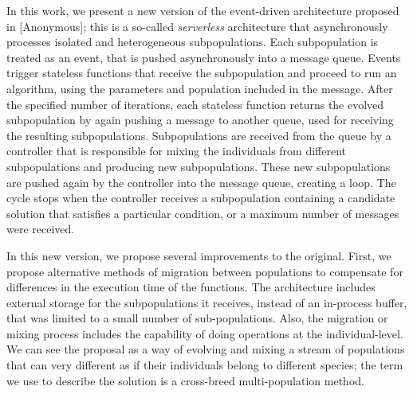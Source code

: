 \documentclass[runningheads]{llncs}
\begin{document}
In this work, we present a new version of the event-driven architecture proposed
in [Anonymous]; this is a so-called {\em serverless} architecture that
asynchronously processes isolated and heterogeneous subpopulations. Each
subpopulation is treated as an event, that is pushed asynchronously into a
message queue. Events trigger stateless functions that receive the subpopulation
and proceed to run an algorithm, using the parameters and population included in
the message. After the specified number of iterations, each stateless function
returns the evolved subpopulation by again pushing a message to another queue,
used for receiving the resulting subpopulations. Subpopulations are received
from the queue by a controller that is responsible for mixing the individuals
from different subpopulations and producing new subpopulations. These new
subpopulations are pushed again by the controller into the message queue,
creating a loop. The cycle stops when the controller receives a subpopulation
containing a candidate solution that satisfies a particular condition, or a
maximum number of messages were received. 

In this new version, we propose several improvements to the original. First, we
propose alternative methods of migration between populations to compensate for
differences in the execution time of the functions. The architecture includes
external storage for the subpopulations it receives, instead of an in-process
buffer, that was limited to a small number of sub-populations. Also, the
migration or mixing process includes the capability of doing operations at the
individual-level. 
We can see the proposal as a way of evolving and mixing a
stream of populations that can very different as if their individuals belong to
different species; the term we use to describe the solution is a cross-breed
multi-population method.

\end{document}
